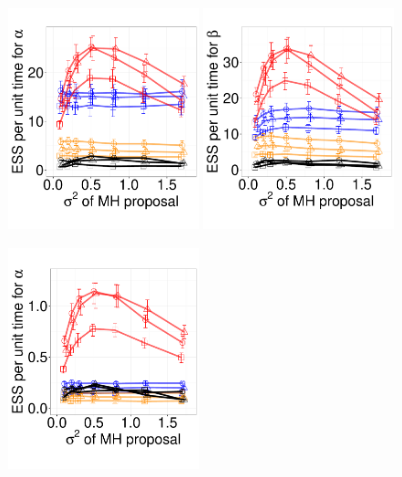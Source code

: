   \begin{figure}[H]
    \vspace{-.2in}
  \centering
  \begin{minipage}[!hp]{0.7\linewidth}
  \centering
  \begin{minipage}[!hp]{0.99\linewidth}
    \includegraphics [width=0.45\textwidth, angle=0]{figs/exp_3_alpha.pdf}
    \includegraphics [width=0.45\textwidth, angle=0]{figs/exp_3_beta.pdf}
  \end{minipage}
  \centering
  \begin{minipage}[!hp]{0.99\linewidth}
   \vspace{-.3in}
    \includegraphics [width=0.45\textwidth, angle=0]{figs/exp_10_alpha.pdf}

\end{minipage}
\end{minipage}
\end{figure}
